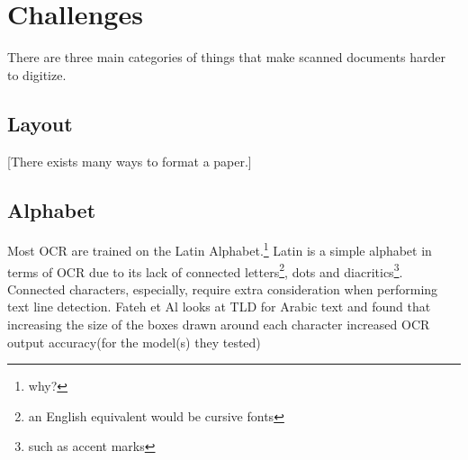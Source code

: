 \documentclass[sigplan,screen,nonacm]{acmart-tagged}
\begin{document}

\section{Challenges}
\label{sec:body}

There are three main categories of things that make scanned documents harder to digitize. 

\subsection{Layout}
\label{sec:Layout}

[There exists many ways to format a paper.] 



\subsection{Alphabet}
\label{sec:Alphabet}


Most OCR are trained on the Latin Alphabet.\footnote{why?} Latin is a simple alphabet in terms of OCR due to its lack of connected letters\footnote{an English equivalent would be cursive fonts}, dots and diacritics\footnote{such as accent marks}. Connected characters, especially, require extra consideration when performing text line detection. Fateh et Al\citep{Fateh:2024} looks at TLD for Arabic text and found that increasing the size of the boxes drawn around each character increased OCR output accuracy(for the model(s) they tested) 
\end{document}
